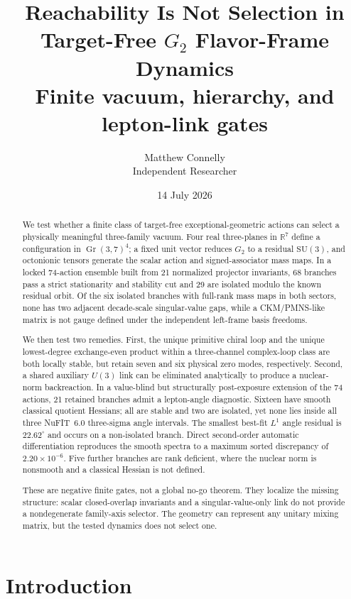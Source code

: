 \documentclass[11pt]{article}
\title{\textbf{Reachability Is Not Selection in Target-Free $G_2$ Flavor-Frame Dynamics}\\[0.35em]
\large Finite vacuum, hierarchy, and lepton-link gates}
\author{Matthew Connelly\\\small Independent Researcher}
\date{14 July 2026}
\newcommand{\Gr}{\operatorname{Gr}}
\newcommand{\SU}{\mathrm{SU}}
\begin{document}
\maketitle

\begin{abstract}
We test whether a finite class of target-free exceptional-geometric actions can select a physically meaningful three-family vacuum.  Four real three-planes in $\mathbb R^7$ define a configuration in $\Gr(3,7)^4$; a fixed unit vector reduces $G_2$ to a residual $\SU(3)$, and octonionic tensors generate the scalar action and signed-associator mass maps.  In a locked 74-action ensemble built from 21 normalized projector invariants, 68 branches pass a strict stationarity and stability cut and 29 are isolated modulo the known residual orbit.  Of the six isolated branches with full-rank mass maps in both sectors, none has two adjacent decade-scale singular-value gaps, while a CKM/PMNS-like matrix is not gauge defined under the independent left-frame basis freedoms.

We then test two remedies.  First, the unique primitive chiral loop and the unique lowest-degree exchange-even product within a three-channel complex-loop class are both locally stable, but retain seven and six physical zero modes, respectively.  Second, a shared auxiliary $U(3)$ link can be eliminated analytically to produce a nuclear-norm backreaction.  In a value-blind but structurally post-exposure extension of the 74 actions, 21 retained branches admit a lepton-angle diagnostic.  Sixteen have smooth classical quotient Hessians; all are stable and two are isolated, yet none lies inside all three NuFIT~6.0 three-sigma angle intervals.  The smallest best-fit $L^1$ angle residual is $22.62^\circ$ and occurs on a non-isolated branch.  Direct second-order automatic differentiation reproduces the smooth spectra to a maximum sorted discrepancy of $2.20\times10^{-6}$.  Five further branches are rank deficient, where the nuclear norm is nonsmooth and a classical Hessian is not defined.

These are negative finite gates, not a global no-go theorem.  They localize the missing structure: scalar closed-overlap invariants and a singular-value-only link do not provide a nondegenerate family-axis selector.  The geometry can represent any unitary mixing matrix, but the tested dynamics does not select one.
\end{abstract}

\section{Introduction}
\end{document}
